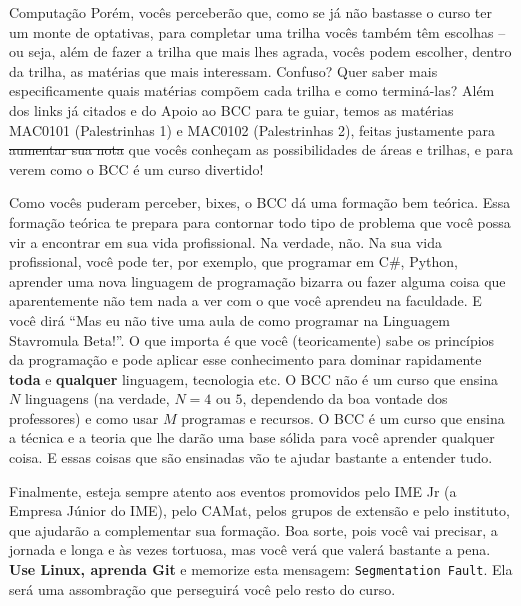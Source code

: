 \begin{subsecao}{Computação}
Porém, vocês perceberão que, como se já não bastasse o curso ter um monte de
optativas, para completar uma trilha vocês também têm escolhas -- ou seja,
além de fazer a trilha que mais lhes agrada, vocês podem escolher, dentro da
trilha, as matérias que mais interessam. Confuso? Quer saber mais
especificamente quais matérias compõem cada trilha e como terminá-las? Além
dos links já citados e do Apoio ao BCC para te guiar, temos as matérias MAC0101
(Palestrinhas 1) e MAC0102 (Palestrinhas 2), feitas justamente para
\sout{aumentar sua nota} que vocês conheçam as possibilidades de áreas e
trilhas, e para verem como o BCC é um curso divertido!

Como vocês puderam perceber, bixes, o BCC dá uma formação bem teórica. Essa
formação teórica te prepara para contornar todo tipo de problema que você
possa vir a encontrar em sua vida profissional. Na verdade, não. Na sua vida
profissional, você pode ter, por exemplo, que programar em C\#, Python,
aprender uma nova linguagem de programação bizarra ou fazer alguma coisa que
aparentemente não tem nada a ver com o que você aprendeu na faculdade. E você
dirá ``Mas eu não tive uma aula de como programar na Linguagem Stavromula
Beta!''. O que importa é que você (teoricamente) sabe os princípios da
programação e pode aplicar esse conhecimento para dominar rapidamente \textbf{toda}
e \textbf{qualquer} linguagem, tecnologia etc. O BCC não é um curso que ensina $N$
linguagens (na verdade, $N = 4$ ou $5$, dependendo da boa vontade dos
professores) e como usar $M$ programas e recursos. O BCC é um curso que ensina
a técnica e a teoria que lhe darão uma base sólida para você aprender qualquer
coisa. E essas coisas que são ensinadas vão te ajudar bastante a entender tudo.

Finalmente, esteja sempre atento aos eventos promovidos pelo IME Jr (a Empresa Júnior do IME),
pelo CAMat, pelos grupos de extensão e pelo instituto, que ajudarão a
complementar sua formação. Boa sorte, pois você vai precisar, a jornada e longa e às vezes tortuosa, mas você verá que valerá bastante a pena. \textbf{Use
Linux, aprenda Git} e memorize esta mensagem: \texttt{Segmentation Fault}. Ela será
uma assombração que perseguirá você pelo resto do curso.


\end{subsecao}
